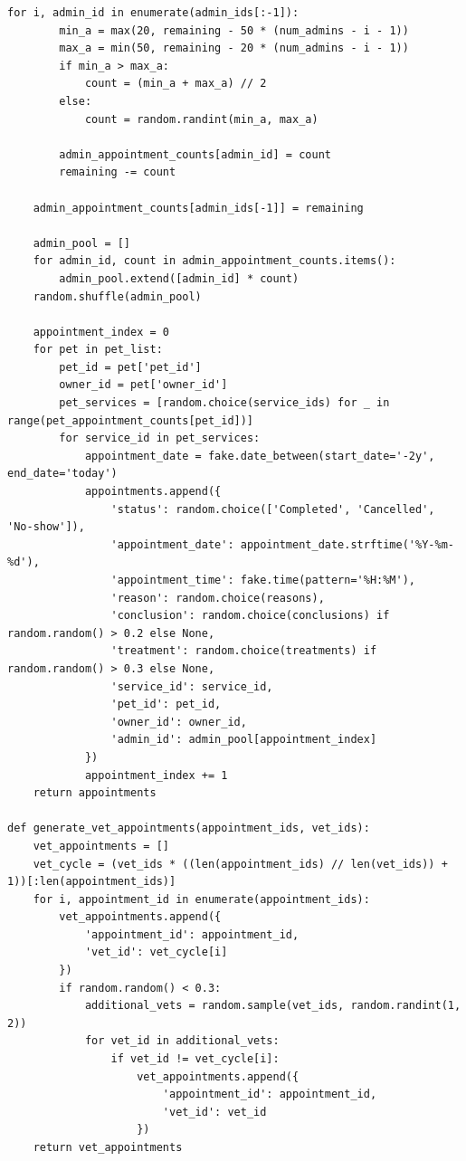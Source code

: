 \documentclass[a4paper]{article}
\begin{document}
\begin{lstlisting}[caption = Генерация значений для таблиц, basicstyle= \scriptsize \ttfamily]
    for i, admin_id in enumerate(admin_ids[:-1]):
        min_a = max(20, remaining - 50 * (num_admins - i - 1))
        max_a = min(50, remaining - 20 * (num_admins - i - 1))
        if min_a > max_a:
            count = (min_a + max_a) // 2
        else:
            count = random.randint(min_a, max_a)
            
        admin_appointment_counts[admin_id] = count
        remaining -= count

    admin_appointment_counts[admin_ids[-1]] = remaining

    admin_pool = []
    for admin_id, count in admin_appointment_counts.items():
        admin_pool.extend([admin_id] * count)
    random.shuffle(admin_pool)
    
    appointment_index = 0
    for pet in pet_list:
        pet_id = pet['pet_id']
        owner_id = pet['owner_id']
        pet_services = [random.choice(service_ids) for _ in range(pet_appointment_counts[pet_id])]
        for service_id in pet_services:
            appointment_date = fake.date_between(start_date='-2y', end_date='today')
            appointments.append({
                'status': random.choice(['Completed', 'Cancelled', 'No-show']),
                'appointment_date': appointment_date.strftime('%Y-%m-%d'),
                'appointment_time': fake.time(pattern='%H:%M'),
                'reason': random.choice(reasons),
                'conclusion': random.choice(conclusions) if random.random() > 0.2 else None,
                'treatment': random.choice(treatments) if random.random() > 0.3 else None,
                'service_id': service_id,
                'pet_id': pet_id,
                'owner_id': owner_id,
                'admin_id': admin_pool[appointment_index]
            })
            appointment_index += 1
    return appointments

def generate_vet_appointments(appointment_ids, vet_ids):
    vet_appointments = []
    vet_cycle = (vet_ids * ((len(appointment_ids) // len(vet_ids)) + 1))[:len(appointment_ids)]
    for i, appointment_id in enumerate(appointment_ids):
        vet_appointments.append({
            'appointment_id': appointment_id,
            'vet_id': vet_cycle[i]
        })
        if random.random() < 0.3:
            additional_vets = random.sample(vet_ids, random.randint(1, 2))
            for vet_id in additional_vets:
                if vet_id != vet_cycle[i]:  
                    vet_appointments.append({
                        'appointment_id': appointment_id,
                        'vet_id': vet_id
                    })
    return vet_appointments
\end{lstlisting}
\end{document}
